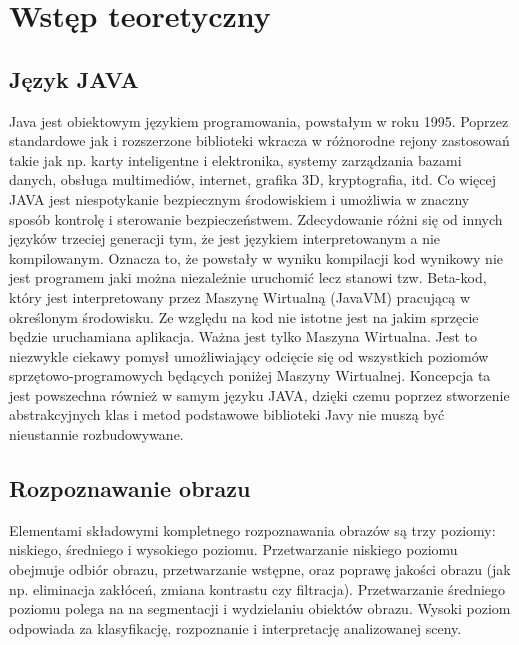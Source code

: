 \section{Wstęp teoretyczny}

\subsection{Język JAVA}
Java jest obiektowym językiem programowania, powstałym w roku 1995. Poprzez standardowe jak i rozszerzone biblioteki wkracza w różnorodne rejony zastosowań takie jak np. karty inteligentne i elektronika, systemy zarządzania bazami danych, obsługa multimediów, internet, grafika 3D, kryptografia, itd. Co więcej JAVA jest niespotykanie bezpiecznym środowiskiem i umożliwia w znaczny sposób kontrolę i sterowanie bezpieczeństwem. Zdecydowanie różni się od innych języków trzeciej generacji tym, że jest językiem interpretowanym a nie kompilowanym. Oznacza to, że powstały w wyniku kompilacji kod wynikowy nie jest programem jaki można niezależnie uruchomić lecz stanowi tzw. Beta-kod, który jest interpretowany przez Maszynę Wirtualną (JavaVM) pracującą w określonym środowisku. Ze względu na kod nie istotne jest na jakim sprzęcie będzie uruchamiana aplikacja. Ważna jest tylko Maszyna Wirtualna. Jest to niezwykle ciekawy pomysł umożliwiający odcięcie się od wszystkich poziomów sprzętowo-programowych będących poniżej Maszyny Wirtualnej. Koncepcja ta jest powszechna również w samym języku JAVA, dzięki czemu poprzez stworzenie abstrakcyjnych klas i metod podstawowe biblioteki Javy nie muszą być nieustannie rozbudowywane.

\subsection{Rozpoznawanie obrazu}
Elementami składowymi kompletnego rozpoznawania obrazów są trzy poziomy: niskiego, średniego i wysokiego poziomu. Przetwarzanie niskiego poziomu obejmuje odbiór obrazu, przetwarzanie wstępne, oraz poprawę jakości obrazu (jak np. eliminacja zakłóceń, zmiana kontrastu czy filtracja). Przetwarzanie średniego poziomu polega na na segmentacji i wydzielaniu obiektów obrazu. Wysoki poziom odpowiada za klasyfikację, rozpoznanie i interpretację analizowanej sceny.
\pagebreak[4]

